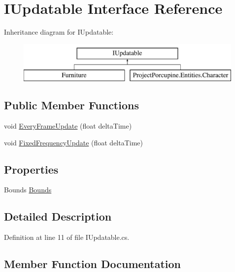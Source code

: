\hypertarget{interface_i_updatable}{}\section{I\+Updatable Interface Reference}
\label{interface_i_updatable}
Inheritance diagram for I\+Updatable\+:\begin{figure}[H]
\begin{center}
\leavevmode
\includegraphics[height=2.000000cm]{interface_i_updatable}
\end{center}
\end{figure}
\subsection*{Public Member Functions}
\begin{DoxyCompactItemize}
\item 
void \hyperlink{interface_i_updatable_a07ea8d8e0858fd96c18baef481632c9d}{Every\+Frame\+Update} (float delta\+Time)
\item 
void \hyperlink{interface_i_updatable_a360da1e579ac8d1ed8adb700176cc45f}{Fixed\+Frequency\+Update} (float delta\+Time)
\end{DoxyCompactItemize}
\subsection*{Properties}
\begin{DoxyCompactItemize}
\item 
Bounds \hyperlink{interface_i_updatable_ac7839b3d04c62fc6b04c4ece5d5beea3}{Bounds}
\end{DoxyCompactItemize}


\subsection{Detailed Description}


Definition at line 11 of file I\+Updatable.\+cs.



\subsection{Member Function Documentation}
\mbox{\label{interface_i_updatable_a07ea8d8e0858fd96c18baef481632c9d}} 
